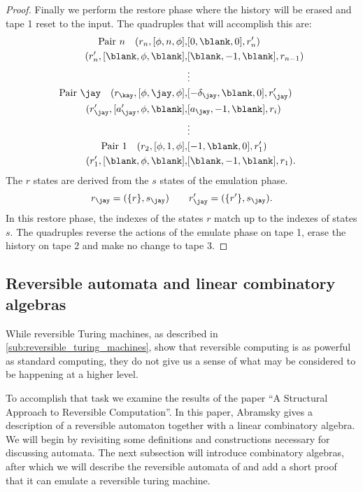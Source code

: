 \begin{proof}
  Finally we perform the restore phase where the history will be erased and tape 1 reset to the
  input. The quadruples that will accomplish this are:
  \begin{align*}
      \text{Pair }n \quad (r_n,[\phi,n,\phi],&[0,\blank,0],r'_n)\\
      (r'_n,[\blank,\phi,\blank],&[\blank,-1,\blank],r_{n-1})\\
      &\vdots\\
      \text{Pair }\jay \quad (r_\kay,[\phi,\jay,\phi],&[-\delta_\jay,\blank,0],r'_\jay)\\
      (r'_\jay,[a'_\jay,\phi,\blank],&[a_\jay,-1,\blank],r_i)\\
      &\vdots\\
      \text{Pair 1} \quad (r_2,[\phi,1,\phi],&[-1,\blank,0],r'_1)\\
      (r'_1,[\blank,\phi,\blank],&[\blank,-1,\blank],r_1).
  \end{align*}
  The $r$ states are derived from the $s$ states of the emulation phase.
  \[
    r_\jay = (\{r\},s_\jay) \qquad    r'_\jay = (\{r'\}, s_\jay).
  \]
  In this restore phase, the indexes of the states $r$ match up to the indexes of states $s$. The
  quadruples reverse the actions of the emulate phase on tape 1, erase the history on tape 2 and
  make no change to tape 3.

\end{proof}



\subsection{Reversible automata and linear combinatory algebras} %
\label{sub:reversible_automata_and_linear_combinatory_algebras}
While reversible Turing machines, as described in \vref{sub:reversible_turing_machines}, show that
reversible computing is as powerful as standard computing, they do not give us a sense of what may
be considered to be happening at a higher level.

To accomplish that task we examine the results of the paper ``A Structural Approach to Reversible
Computation''\cite{abramsky05:reversible}. In this paper, Abramsky gives a description of a
reversible automaton together with a linear combinatory algebra. We will begin by revisiting some
definitions and constructions necessary for discussing automata. The next subsection will introduce
combinatory algebras, after which we will describe the reversible automata of
\cite{abramsky05:reversible} and add a short proof that it can emulate a reversible turing machine.

